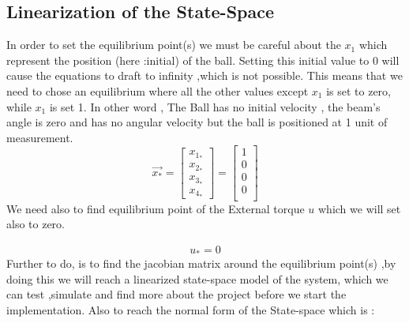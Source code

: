 \documentclass{article}
\begin{document}
\subsection{Linearization of the State-Space}
In order to set the equilibrium point(s) we must be careful about the $x_1$ which represent the position (here :initial) of the ball.
Setting this initial value to 0 will cause the equations to draft to infinity ,which is not possible.
This means that we need to chose an equilibrium where all the other values except $x_1$ is set to zero, while $x_1$ is set 1.
In other word , The Ball has no initial velocity , the beam's angle is zero and has no angular velocity but the ball is positioned at 1 unit of measurement.
\begin{equation}
	\vec{x_*} =
	\begin{bmatrix}
		x_{\text{$1_*$}} \\
		x_{\text{$2_*$}} \\
		x_{\text{$3_*$}} \\
		x_{\text{$4_*$}}
	\end{bmatrix}=
	\begin{bmatrix}
		1 \\
		0 \\
		0 \\
		0 \\
	\end{bmatrix}
\end{equation}
We need also to find equilibrium point of the External torque $u$ which we will set also to zero.

\begin{equation}
	\begin{split}
		u_* = 0
	\end{split}
\end{equation}
Further to do, is to find the jacobian matrix around the equilibrium point(s) ,by doing this we will reach a linearized state-space model of the system,
which we can test ,simulate and find more about the project before we start the implementation.
Also to reach the normal form of the State-space which is :
\end{document}
